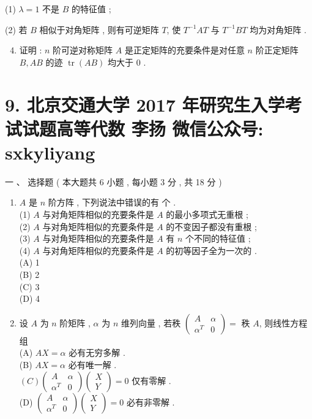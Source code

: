 \documentclass[10pt]{article}
\begin{document}
{\begin{enumerate}
\end{enumerate}
(1) $\lambda=1$  不是  $B$  的特征值 ;

(2)  若  $B$  相似于对角矩阵 ,  则有可逆矩阵  $T$,  使  $T^{-1} A T$  与  $T^{-1} B T$  均为对角矩阵 .

\begin{enumerate}
  \setcounter{enumi}{3}
  \item  证明 : $n$  阶可逆对称矩阵  $A$  是正定矩阵的充要条件是对任意  $n$  阶正定矩阵  $B, A B$  的迹  $\operatorname{tr}(A B)$  均大于  0 .
\end{enumerate}
\section{9. 北京交通大学 2017 年研究生入学考试试题高等代数 
 李扬 
 微信公众号: sxkyliyang}
 一 、 选择题 ( 本大题共  6  小题 ,  每小题  3  分 ,  共  18  分 )

\begin{enumerate}
  \item $A$  是  $n$  阶方阵 ,  下列说法中错误的有   个 .\\
(1) $A$  与对角矩阵相似的充要条件是  $A$  的最小多项式无重根 ;\\
(2) $A$  与对角矩阵相似的充要条件是  $A$  的不变因子都没有重根 ;\\
(3) $A$  与对角矩阵相似的充要条件是  $A$  有  $n$  个不同的特征值 ;\\
(4) $A$  与对角矩阵相似的充要条件是  $A$  的初等因子全为一次的 .\\
(A) 1\\
(B) 2\\
(C) 3\\
(D) 4

  \item  设  $A$  为  $n$  阶矩阵 , $\alpha$  为  $n$  维列向量 ,  若秩  $\left(\begin{array}{cc}A & \alpha \\ \alpha^{T} & 0\end{array}\right)=$  秩  $A$,  则线性方程组 \\
(A) $A X=\alpha$  必有无穷多解 .\\
(B) $A X=\alpha$  必有唯一解 .\\
$(C)\left(\begin{array}{cc}A & \alpha \\ \alpha^{T} & 0\end{array}\right)\left(\begin{array}{c}X \\ Y\end{array}\right)=0$  仅有零解 .\\
(D) $\left(\begin{array}{cc}A & \alpha \\ \alpha^{T} & 0\end{array}\right)\left(\begin{array}{l}X \\ Y\end{array}\right)=0$  必有非零解 .


\end{enumerate}}
\end{document}
